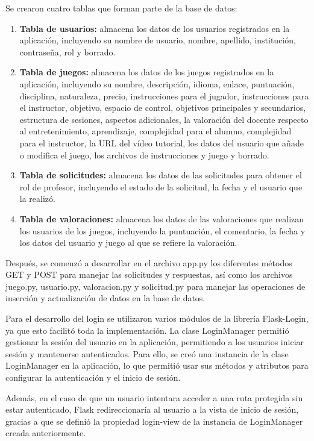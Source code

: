 Se crearon cuatro tablas que forman parte de la base de datos: 
\begin{enumerate}
    \item \textbf{Tabla de usuarios:} almacena los datos de los usuarios registrados en la aplicación, incluyendo su nombre de usuario, nombre, apellido, institución, contraseña, rol y borrado.
    \item \textbf{Tabla de juegos:} almacena los datos de los juegos registrados en la aplicación, incluyendo su nombre, descripción, idioma, enlace, puntuación, disciplina, naturaleza, precio, instrucciones para el jugador, instrucciones para el instructor, objetivo, espacio de control, objetivos principales y secundarios, estructura de sesiones, aspectos adicionales, la valoración del docente respecto al entretenimiento, aprendizaje, complejidad para el alumno, complejidad para el instructor, la URL del vídeo tutorial, los datos del usuario que añade o modifica el juego, los archivos de instrucciones y juego y borrado.
    \item \textbf{Tabla de solicitudes:} almacena los datos de las solicitudes para obtener el rol de profesor, incluyendo el estado de la solicitud, la fecha y el usuario que la realizó.
    \item \textbf{Tabla de valoraciones:} almacena los datos de las valoraciones que realizan los usuarios de los juegos, incluyendo la puntuación, el comentario, la fecha y los datos del usuario y juego al que se refiere la valoración.
\end{enumerate}

Después, se comenzó a desarrollar en el archivo app.py los diferentes métodos GET y POST para manejar las solicitudes y respuestas, así como los archivos juego.py, usuario.py, valoracion.py y solicitud.py para manejar las operaciones de inserción y actualización de datos en la base de datos.

Para el desarrollo del login se utilizaron varios módulos de la librería Flask-Login, ya que esto facilitó toda la implementación. La clase LoginManager permitió gestionar la sesión del usuario en la aplicación, permitiendo a los usuarios iniciar sesión y mantenerse autenticados. Para ello, se creó una instancia de la clase LoginManager en la aplicación, lo que permitió usar sus métodos y atributos para configurar la autenticación y el inicio de sesión.

Además, en el caso de que un usuario intentara acceder a una ruta protegida sin estar autenticado, Flask redireccionaría al usuario a la vista de inicio de sesión, gracias a que se definió la propiedad login-view de la instancia de LoginManager creada anteriormente. 

